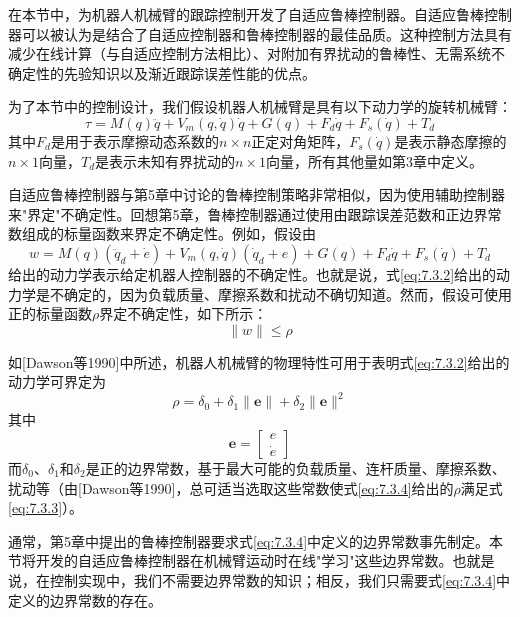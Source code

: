 \documentclass[UTF8]{ctexart}
\begin{document}
在本节中，为机器人机械臂的跟踪控制开发了自适应鲁棒控制器。自适应鲁棒控制器可以被认为是结合了自适应控制器和鲁棒控制器的最佳品质。这种控制方法具有减少在线计算（与自适应控制方法相比）、对附加有界扰动的鲁棒性、无需系统不确定性的先验知识以及渐近跟踪误差性能的优点。

为了本节中的控制设计，我们假设机器人机械臂是具有以下动力学的旋转机械臂：
\begin{equation}\label{eq:7.3.1}
\tau = M(q)\ddot{q} + V_m(q,\dot{q})\dot{q} + G(q) + F_d\dot{q} + F_s(\dot{q}) + T_d
\end{equation}
其中$F_d$是用于表示摩擦动态系数的$n \times n$正定对角矩阵，$F_s(\dot{q})$是表示静态摩擦的$n \times 1$向量，$T_d$是表示未知有界扰动的$n \times 1$向量，所有其他量如第3章中定义。

自适应鲁棒控制器与第5章中讨论的鲁棒控制策略非常相似，因为使用辅助控制器来"界定"不确定性。回想第5章，鲁棒控制器通过使用由跟踪误差范数和正边界常数组成的标量函数来界定不确定性。例如，假设由
\begin{equation}\label{eq:7.3.2}
w = M(q)(\ddot{q}_d + \dot{e}) + V_m(q,\dot{q})(\dot{q}_d + e) + G(q) + F_d\dot{q} + F_s(\dot{q}) + T_d
\end{equation}
给出的动力学表示给定机器人控制器的不确定性。也就是说，式\eqref{eq:7.3.2}给出的动力学是不确定的，因为负载质量、摩擦系数和扰动不确切知道。然而，假设可使用正的标量函数$\rho$界定不确定性，如下所示：
\begin{equation}\label{eq:7.3.3}
\|w\| \leq \rho
\end{equation}

如[Dawson等1990]中所述，机器人机械臂的物理特性可用于表明式\eqref{eq:7.3.2}给出的动力学可界定为
\begin{equation}\label{eq:7.3.4}
\rho = \delta_0 + \delta_1\|\mathbf{e}\| + \delta_2\|\mathbf{e}\|^2
\end{equation}
其中
\begin{equation}\label{eq:7.3.5}
\mathbf{e} = \begin{bmatrix} e \\ \dot{e} \end{bmatrix}
\end{equation}
而$\delta_0$、$\delta_1$和$\delta_2$是正的边界常数，基于最大可能的负载质量、连杆质量、摩擦系数、扰动等（由[Dawson等1990]，总可适当选取这些常数使式\eqref{eq:7.3.4}给出的$\rho$满足式\eqref{eq:7.3.3}）。

通常，第5章中提出的鲁棒控制器要求式\eqref{eq:7.3.4}中定义的边界常数事先制定。本节将开发的自适应鲁棒控制器在机械臂运动时在线"学习"这些边界常数。也就是说，在控制实现中，我们不需要边界常数的知识；相反，我们只需要式\eqref{eq:7.3.4}中定义的边界常数的存在。
\end{document}
